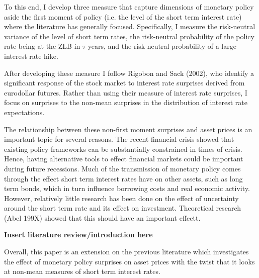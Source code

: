 \documentclass[11pt]{article}
\begin{document}
To this end, I develop three measure that capture dimensions of monetary policy aside the first moment of policy (i.e. the level of the short term interest rate) where the literature has generally focused. Specifically, I measure the risk-neutral variance of the level of short term rates, the risk-neutral probability of the policy rate being at the ZLB in $\tau$ years, and the risk-neutral probability of a large interest rate hike. 

After developing these measure I follow Rigobon and Sack (2002), who identify a significant response of the stock market to interest rate surprises derived from eurodollar futures. Rather than using their measure of interest rate surprises, I focus on surprises to the non-mean surprises in the distribution of interest rate expectations. 

The relationship between these non-first moment surprises and asset prices is an important topic for several reasons. The recent financial crisis showed that existing policy frameworks can be substantially constrained in times of crisis. Hence, having alternative tools to effect financial markets could be important during future recessions.  Much of the transmission of monetary policy comes through the effect short term interest rates have on other assets, such as long term bonds, which in turn influence borrowing costs and real economic activity. However, relatively little research has been done on the effect of uncertainty around the short term rate and its effect on investment. Theoretical research (Abel 199X) showed that this should have an important effectt.   


\textbf{Insert literature review/introduction here}

Overall, this paper is an extension on the previous literature which investigates the effect of monetary policy surprises on asset prices with the twist that it looks at non-mean measures of short term interest rates. 
\end{document}

